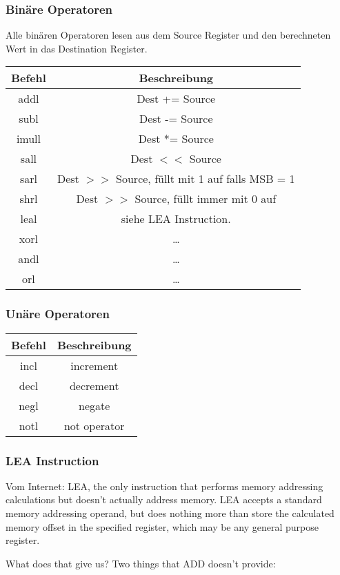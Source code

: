 \documentclass[a4paper, 11pt]{article}
\begin{document}
\subsubsection{Binäre Operatoren}
Alle binären Operatoren lesen aus dem Source Register und den berechneten Wert in das Destination Register.

\begin{tabular}{|c|c|}
	\hline
	Befehl & Beschreibung\\\hline\hline
	addl & Dest += Source\\\hline
	subl & Dest -= Source \\\hline
	imull & Dest *= Source \\\hline
	sall & Dest $<<$ Source\\\hline
	sarl & Dest $>>$ Source, füllt mit 1 auf falls MSB = 1 \\\hline
	shrl & Dest $>>$ Source, füllt immer mit 0 auf\\\hline
	leal & siehe LEA Instruction. \\\hline
	xorl & \ldots \\\hline
	andl &\ldots  \\\hline
	orl & \ldots \\\hline
\end{tabular}

\subsubsection{Unäre Operatoren}
\begin{tabular}{|c|c|}
	\hline
	Befehl & Beschreibung\\\hline\hline
	incl & increment \\\hline
	decl & decrement \\\hline
	negl & negate \\\hline
	notl & not operator\\\hline
\end{tabular}

\subsubsection{LEA Instruction}
Vom Internet: LEA, the only instruction that performs memory addressing calculations but doesn't actually address memory. LEA accepts a standard memory addressing operand, but does nothing more than store the calculated memory offset in the specified register, which may be any general purpose register.

What does that give us? Two things that ADD doesn't provide:
\end{document}
